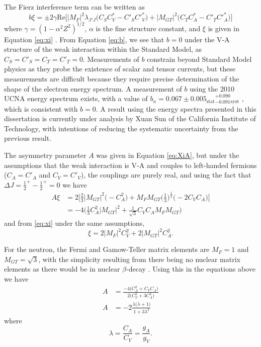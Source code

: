 The Fierz interference term can be written as 
\begin{equation}
  b\xi = \pm 2\gamma \mathrm{Re}\bigg[|M_{F}|^2 \lambda_{J'J}\big(C_SC^*_V-C'_SC'^*_V \big) 
    + |M_{GT}|^2\big(C_TC^*_A-C'_TC'^*_A \big) \bigg]
  \label{eq:b}
\end{equation}
where $\gamma = (1-\alpha ^2 Z^2)^{1/2}$, $\alpha$ is the fine structure constant, and $\xi$ is given in
Equation \ref{eq:xi} \cite{jackson1957a}. From Equation \ref{eq:b}, we see that $b=0$ under the V-A structure
of the weak interaction within the Standard Model, as
$C_S = C'_S = C_T = C'_T = 0$. Measurements of $b$ constrain
beyond Standard Model physics as they probe the existence of scalar and tensor currents,
but these measurements are difficult because they
require precise determination of the shape of the electron energy spectrum. A measurement of
$b$ using the 2010 UCNA energy spectrum exists, with a value of
$b_n = 0.067 \pm 0.005_{\mathrm{stat}}{}^{+ 0.090}_{-0.091}{}_{\mathrm{syst}}$ \cite{hickerson2017}, which is consistent with
$b=0$. A result using the energy
spectra presented in this dissertation is currently under analysis by Xuan Sun of the California Institute of
Technology, with intentions of reducing the
systematic uncertainty from the previous result.

The asymmetry parameter $A$ was given in Equation \ref{eq:XiA}, but under the assumptions that the
weak interaction is V-A and couples to left-handed fermions ($C_A=C'_A$ and $C_V=C'_V$), the couplings
are purely real, and using the fact that
$\Delta J = {\frac{1}{2}}^+ - {\frac{1}{2}}^+ = 0$ we have
%
\begin{align}
  A\xi &= 2\bigg[ \frac{2}{3} |M_{GT}|^2 \Big(-C_A^2\Big) 
    + M_FM_{GT}\Big(\frac{1}{3}\Big)^{\frac{1}{2}}\big(-2C_VC_A \big) \bigg] \\
  &=-4 \bigg( \frac{1}{3}C_A^2|M_{GT}|^2 + \frac{1}{\sqrt{3}} C_VC_A M_FM_{GT} \bigg)
  \label{eq:XiAsimple}
\end{align}
%
and from \ref{eq:xi} under the same assumptions,
%
\begin{equation}
  \xi = 2|M_F|^2C_V^2+2|M_{GT}|^2C_A^2.
\end{equation}
%

For the neutron, the Fermi and Gamow-Teller matrix elements are $M_F=1$ and
$M_{GT} = \sqrt{3}$, with the simplicity resulting from there being no
nuclear matrix elements as there would be in nuclear $\beta$-decay
\cite{grotz1990}. Using this in the equations above we have
%
\begin{align}
  A & =\frac{-4 \big( C_A^2 +  C_VC_A \big)}{2 \big(C_V^2 + 3C_A^2\big)} \\
  A & = -2 \frac{ \lambda \big(\lambda+1\big)}{ 1 + 3\lambda^2}
\end{align}
%
where
%
\begin{equation}
  \lambda = \frac{C_A}{C_V} = \frac{g_A}{g_V}.
\end{equation}

